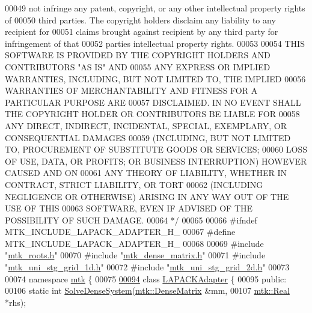 \begin{DoxyCode}
00049 \textcolor{comment}{not infringe any patent, copyright, or any other intellectual property rights of}
00050 \textcolor{comment}{third parties. The copyright holders disclaim any liability to any recipient for}
00051 \textcolor{comment}{claims brought against recipient by any third party for infringement of that}
00052 \textcolor{comment}{parties intellectual property rights.}
00053 \textcolor{comment}{}
00054 \textcolor{comment}{THIS SOFTWARE IS PROVIDED BY THE COPYRIGHT HOLDERS AND CONTRIBUTORS "AS IS" AND}
00055 \textcolor{comment}{ANY EXPRESS OR IMPLIED WARRANTIES, INCLUDING, BUT NOT LIMITED TO, THE IMPLIED}
00056 \textcolor{comment}{WARRANTIES OF MERCHANTABILITY AND FITNESS FOR A PARTICULAR PURPOSE ARE}
00057 \textcolor{comment}{DISCLAIMED. IN NO EVENT SHALL THE COPYRIGHT HOLDER OR CONTRIBUTORS BE LIABLE FOR}
00058 \textcolor{comment}{ANY DIRECT, INDIRECT, INCIDENTAL, SPECIAL, EXEMPLARY, OR CONSEQUENTIAL DAMAGES}
00059 \textcolor{comment}{(INCLUDING, BUT NOT LIMITED TO, PROCUREMENT OF SUBSTITUTE GOODS OR SERVICES;}
00060 \textcolor{comment}{LOSS OF USE, DATA, OR PROFITS; OR BUSINESS INTERRUPTION) HOWEVER CAUSED AND ON}
00061 \textcolor{comment}{ANY THEORY OF LIABILITY, WHETHER IN CONTRACT, STRICT LIABILITY, OR TORT}
00062 \textcolor{comment}{(INCLUDING NEGLIGENCE OR OTHERWISE) ARISING IN ANY WAY OUT OF THE USE OF THIS}
00063 \textcolor{comment}{SOFTWARE, EVEN IF ADVISED OF THE POSSIBILITY OF SUCH DAMAGE.}
00064 \textcolor{comment}{*/}
00065 
00066 \textcolor{preprocessor}{#ifndef MTK\_INCLUDE\_LAPACK\_ADAPTER\_H\_}
00067 \textcolor{preprocessor}{#define MTK\_INCLUDE\_LAPACK\_ADAPTER\_H\_}
00068 
00069 \textcolor{preprocessor}{#include "\hyperlink{mtk__roots_8h}{mtk\_roots.h}"}
00070 \textcolor{preprocessor}{#include "\hyperlink{mtk__dense__matrix_8h}{mtk\_dense\_matrix.h}"}
00071 \textcolor{preprocessor}{#include "\hyperlink{mtk__uni__stg__grid__1d_8h}{mtk\_uni\_stg\_grid\_1d.h}"}
00072 \textcolor{preprocessor}{#include "\hyperlink{mtk__uni__stg__grid__2d_8h}{mtk\_uni\_stg\_grid\_2d.h}"}
00073 
00074 \textcolor{keyword}{namespace }\hyperlink{namespacemtk}{mtk} \{
00075 
\hypertarget{mtk__lapack__adapter_8h_source_l00094}{}\hyperlink{classmtk_1_1LAPACKAdapter}{00094} \textcolor{keyword}{class }\hyperlink{classmtk_1_1LAPACKAdapter}{LAPACKAdapter} \{
00095  \textcolor{keyword}{public}:
00106   \textcolor{keyword}{static} \textcolor{keywordtype}{int} \hyperlink{classmtk_1_1LAPACKAdapter_a7428bccf74fd4a4af68fb7233846da22}{SolveDenseSystem}(\hyperlink{classmtk_1_1DenseMatrix}{mtk::DenseMatrix} &mm,
00107                               \hyperlink{group__c01-roots_gac080bbbf5cbb5502c9f00405f894857d}{mtk::Real} *rhs);

\end{DoxyCode}
